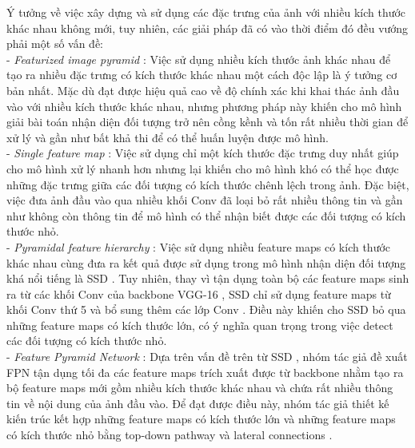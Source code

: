 {    \noindent
    Ý tưởng về việc xây dựng và sử dụng các đặc trưng của ảnh với nhiều kích thước khác nhau không mới, tuy nhiên, các giải pháp đã có vào thời điểm đó đều vướng phải một số vấn đề: \\
    - \textit{Featurized image pyramid} : Việc sử dụng nhiều kích thước ảnh khác nhau để tạo ra nhiều đặc trưng có kích thước khác nhau một cách độc lập là ý tưởng cơ bản nhất. Mặc dù đạt được hiệu quả cao về độ chính xác khi khai thác ảnh đầu vào với nhiều kích thước khác nhau, nhưng phương pháp này khiến cho mô hình giải bài toán nhận diện đối tượng  trở nên cồng kềnh và tốn rất nhiều thời gian để xử lý và gần như bất khả thi để có thể huấn luyện được mô hình. \\
    - \textit{Single feature map} : Việc sử dụng chỉ một kích thước đặc trưng duy nhất giúp cho mô hình xử lý nhanh hơn nhưng lại khiến cho mô hình khó có thể học được những đặc trưng giữa các đối tượng có kích thước chênh lệch trong ảnh. Đặc biệt, việc đưa ảnh đầu vào qua nhiều khối Conv đã loại bỏ rất nhiều thông tin và gần như không còn thông tin để mô hình có thể nhận biết được các đối tượng có kích thước nhỏ. \\
    - \textit{Pyramidal feature hierarchy} : Việc sử dụng nhiều feature maps  có kích thước khác nhau cùng đưa ra kết quả được sử dụng trong mô hình nhận diện đối tượng  khá nổi tiếng là SSD  \cite{liu2016ssd}. Tuy nhiên, thay vì tận dụng toàn bộ các feature maps  sinh ra từ các khối Conv của backbone  VGG-16 , SSD  chỉ sử dụng feature maps  từ khối Conv thứ 5 và bổ sung thêm các lớp Conv . Điều này khiến cho SSD  bỏ qua những feature maps  có kích thước lớn, có ý nghĩa quan trọng trong việc detect các đối tượng có kích thước nhỏ. \\
    - \textit{Feature Pyramid Network} : Dựa trên vấn đề trên từ SSD , nhóm tác giả đề xuất FPN  tận dụng tối đa các feature maps  trích xuất được từ backbone  nhằm tạo ra bộ feature maps  mới gồm nhiều kích thước khác nhau và chứa rất nhiều thông tin về nội dung của ảnh đầu vào. Để đạt được điều này, nhóm tác giả thiết kế kiến trúc kết hợp những feature maps  có kích thước lớn và những feature maps  có kích thước nhỏ bằng top-down pathway  và lateral connections .

}
